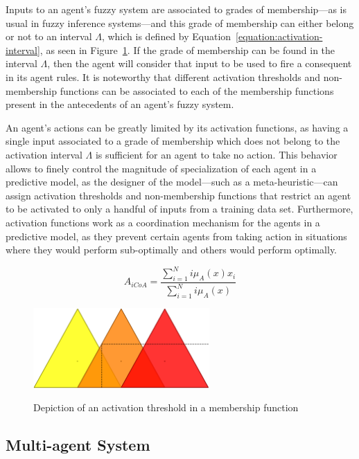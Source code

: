\documentclass[review]{elsarticle}
\begin{document}
Inputs to an agent's fuzzy system are associated to grades of membership---as
is usual in fuzzy inference systems---and this grade of membership can either
belong or not to an interval $\Lambda$, which is defined by
Equation~\ref{equation:activation-interval}, as seen in
Figure~\ref{figure:activation-threshold}. If the grade of membership can be
found in the interval $\Lambda$, then the agent will consider that input to be
used to fire a consequent in its agent rules. It is noteworthy that different
activation thresholds and non-membership functions can be associated to each of
the membership functions present in the antecedents of an agent's fuzzy system.

An agent's actions can be greatly limited by its activation functions, as
having a single input associated to a grade of membership which does not belong
to the activation interval $\Lambda$ is sufficient for an agent to take no
action. This behavior allows to finely control the magnitude of specialization
of each agent in a predictive model, as the designer of the model---such as a
meta-heuristic---can assign activation thresholds and non-membership functions
that restrict an agent to be activated to only a handful of inputs from a
training data set. Furthermore, activation functions work as a coordination
mechanism for the agents in a predictive model, as they prevent certain agents
from taking action in situations where they would perform sub-optimally and
others would perform optimally.

\begin{equation}
  \label{equation:activation-interval}
  A_{iCoA} = \dfrac{\sum_{i=1}^{N} i\mu_{A}(x) x_{i}}{\sum_{i=1}^{N}
    i\mu_{A}(x)}
\end{equation}

\begin{figure}
  \caption{Depiction of an activation threshold in a membership function}
  \centering
  \includegraphics[width=0.6\textwidth]{img/antecedents.png}
  \label{figure:activation-threshold}
\end{figure}

\subsection{Multi-agent System}
\label{subsection:mult-agent-system}
\end{document}
